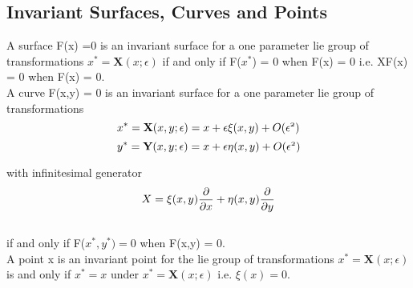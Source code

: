 \documentclass[A4paper, 22pt]{article}
\begin{document}
\subsection{Invariant Surfaces, Curves and Points}
A surface F(x) =0 is an invariant surface for a one parameter lie group of transformations $x^{*} = \textbf{X}(x;\epsilon)$ if and only if F($x^{*}$) = 0 when F(x) = 0 i.e. XF(x) = 0 when F(x) = 0.\\

A curve F(x,y) = 0 is an invariant surface for a one parameter lie group of transformations
\[\mathnormal{x^{*} = \textbf{X}(x,y;\epsilon) = x + \epsilon \xi(x,y) + O(\epsilon^{2})}\]
\[
\mathnormal{y^{*} = \textbf{Y}(x,y;\epsilon) = x + \epsilon \eta(x,y) + O(\epsilon^{2})}\]

with infinitesimal generator
\[\mathnormal{X = \xi(x,y)\frac{\partial }{\partial x} + \eta(x,y)\frac{\partial }{\partial y}}\]\\

if and only if F($x^{*},y^{*}) = 0$ when F(x,y) = 0.\\

A point x is an invariant point for the lie group of transformations $x^{*} = \textbf{X}(x;\epsilon)$ is and only if $x^{*}=x$ under  $x^{*} = \textbf{X}(x;\epsilon)$ i.e. $\xi(x) = 0.$
\newpage
\end{document}
